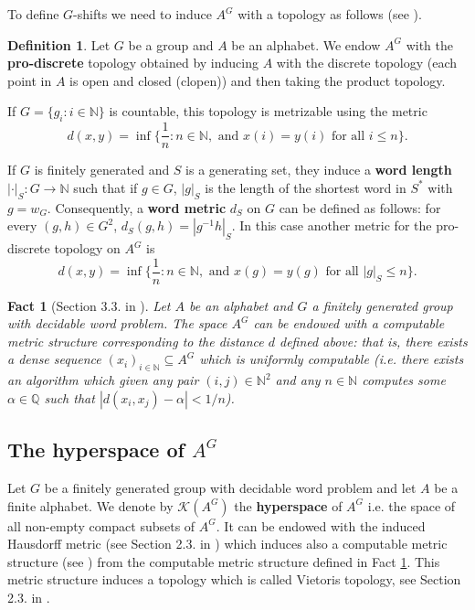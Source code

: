 \documentclass[french,american]{article}
\theoremstyle{plain}
\theoremstyle{definition}
\newtheorem{definition}[theorem]{Definition}
\theoremstyle{remark}
\theoremstyle{plain}
\newtheorem{fact}[theorem]{Fact}
\begin{document}
To define $G$-shifts we need to induce $A^{G}$ with a topology as
follows (see \cite{ceccherini2010cellular}).
\begin{definition}
Let $G$ be a group and $A$ be an alphabet. We endow $A^{G}$ with
the \textbf{pro-discrete} topology obtained by inducing $A$ with
the discrete topology (each point in $A$ is open and closed (clopen))
and then taking the product topology. 

If $G=\{g_{i}:i\in\mathbb{N}\}$ is countable, this topology is metrizable
using the metric 
\[
d(x,y)=\inf\{\frac{1}{n}:n\in\mathbb{N},\text{ and }x(i)=y(i)\text{ for all }i\leq n\}.
\]

If $G$ is finitely generated and $S$ is a generating set, they induce
a \textbf{word length} $|\cdot|_{S}:G\rightarrow\mathbb{N}$ such
that if $g\in G$, $|g|_{S}$ is the length of the shortest word in
$S^{*}$ with $g=w_{G}$. Consequently, a \textbf{word metric} $d_{S}$
on $G$ can be defined as follows: for every $(g,h)\in G^{2}$, $d_{S}(g,h)=|g^{-1}h|_{S}$.
In this case another metric for the pro-discrete topology on $A^{G}$
is 
\[
d(x,y)=\inf\{\frac{1}{n}:n\in\mathbb{N},\text{ and }x(g)=y(g)\text{ for all }|g|_S\leq n\}.
\]
\end{definition}

\begin{fact}[Section 3.3. in \cite{barbieri2024effective}]
\label{fact:AGcomputablemetric}
Let $A$ be an alphabet and $G$ a finitely generated group with decidable word problem. The space $A^{G}$ can be endowed with a computable
metric structure corresponding to the distance $d$ defined above: that is, there exists a dense
sequence $(x_{i})_{i\in\mathbb{N}}\subseteq A^{G}$ which is uniformly
computable (i.e. there exists an algorithm which given any pair $(i,j)\in\mathbb{N}^{2}$
and any $n\in\mathbb{N}$ computes some $\alpha\in\mathbb{Q}$ such
that $|d(x_{i},x_{j})-\alpha|<1/n$).

\end{fact}


\subsection[The hyperspace of A\^{}G]{The hyperspace of $A^{G}$}\label{subsec:The-hyperspace-of}

Let $G$ be a finitely generated group with decidable word problem
and let $A$ be a finite alphabet. We denote by $\mathcal{K}(A^{G})$
the \textbf{hyperspace} of $A^{G}$ i.e. the space of all non-empty
compact subsets of $A^{G}$. It can be endowed with the induced Hausdorff
metric (see Section 2.3. in \cite{Phdamir2024}) which induces also
a computable metric structure (see \cite{Iljazović2021}) from the
computable metric structure defined in Fact \ref{fact:AGcomputablemetric}.
This metric structure induces a topology which is called Vietoris
topology, see Section 2.3. in \cite{Phdamir2024}.
\end{document}
